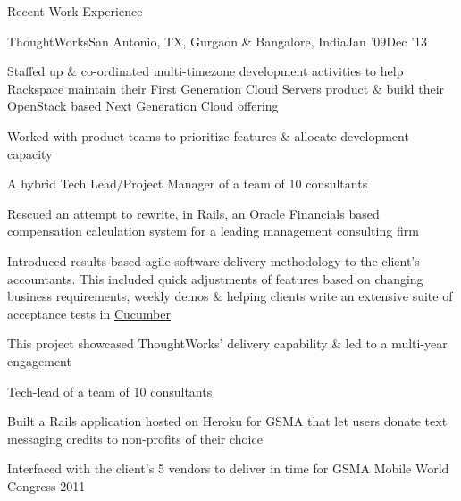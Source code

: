 \documentclass{resume} %
\begin{document}
\begin{rSection}{Recent Work Experience}
\begin{rSubsection}{ThoughtWorks}{San Antonio, TX, Gurgaon \& Bangalore, India}{Jan '09}{Dec '13}
  \item Staffed up \& co-ordinated multi-timezone development activities to help Rackspace maintain their First Generation Cloud Servers product \& build their OpenStack based Next Generation Cloud offering
    \item Worked with product teams to prioritize features \& allocate development capacity
\end{rSubsection}\vspace{-1em}


\begin{rSubsection}{}{}{}{}
  {A hybrid Tech Lead/Project Manager of a team of 10 consultants}

\item Rescued an attempt to rewrite, in Rails, an Oracle Financials based compensation calculation system for a leading management consulting firm
\item Introduced results-based agile software delivery
  methodology to the client's accountants. This included quick
  adjustments of features based on changing business requirements,
  weekly demos \& helping clients write an extensive suite
  of acceptance tests in \href{https://cucumber.io/}{Cucumber}
\item This project showcased ThoughtWorks' delivery capability \& led to a multi-year engagement

\end{rSubsection}\vspace{-1em}


\begin{rSubsection}{}{}{}{}{Tech-lead of a team of 10 consultants}
\item Built a Rails application hosted on Heroku for GSMA that let users donate text messaging credits to non-profits of their choice
  \item Interfaced with the client's 5 vendors to deliver in time for GSMA Mobile World Congress 2011

\end{rSubsection}\vspace{-1em}



\end{rSection}
\end{document}
